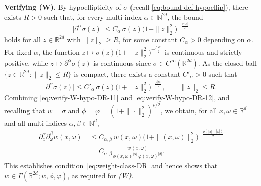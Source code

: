 \documentclass[a4paper,12pt]{article}
\let\originalleft\left
\let\originalright\right
\renewcommand{\left}{\mathopen{}\mathclose\bgroup\originalleft}
\renewcommand{\right}{\aftergroup\egroup\originalright}
\newcommand{\N}{\mathbb{N}}
\newcommand{\R}{\mathbb{R}}
\begin{document}

\textbf{Verifying (W).}
By hypoellipticity of $\sigma$ (recall \eqref{eq:bound-def-hypoellip}), there exists
$R>0$ such that, for every multi-index $\alpha\in\N^{2d}$, the bound
\begin{equation}\label{eq:verify-W-hypo-DR-11}
    \bigl|\partial^\alpha \sigma(z)\bigr|
    \le
    C_\alpha\,\sigma(z)
    \bigl(1+\|z\|_2^2\bigr)^{-\frac{\rho|\alpha|}{2}}
\end{equation}
holds for all $z\in\R^{2d}$ with $\|z\|_2\ge R$, for some constant $C_\alpha>0$
depending on $\alpha$.
For fixed $\alpha$, the function
$z\mapsto \sigma(z)\bigl(1+\|z\|_2^2\bigr)^{-\frac{\rho|\alpha|}{2}}$ is continuous
and strictly positive, while $z\mapsto \partial^\alpha\sigma(z)$ is continuous
since $\sigma\in C^\infty(\R^{2d})$.
As the closed ball $\{z\in\R^{2d}:\|z\|_2\le R\}$ is compact, there exists a
constant $C'_\alpha>0$ such that
\begin{equation}\label{eq:verify-W-hypo-DR-12}
    \bigl|\partial^\alpha \sigma(z)\bigr|
    \le
    C'_\alpha\,\sigma(z)
    \bigl(1+\|z\|_2^2\bigr)^{-\frac{\rho|\alpha|}{2}},
    \qquad
    \|z\|_2 \le R.
\end{equation}
Combining \eqref{eq:verify-W-hypo-DR-11} and \eqref{eq:verify-W-hypo-DR-12}, and
recalling that $w=\sigma$ and $\phi=\varphi=(1+\|\cdot\|_2^2)^{\rho/2}$, we obtain,
for all $x,\omega\in\R^d$ and all multi-indices $\alpha,\beta\in\N^d$,
\begin{align}
    \bigl|\partial_x^\alpha \partial_\omega^\beta w(x,\omega)\bigr|
    &\le
    C_{\alpha,\beta}\,w(x,\omega)
    \bigl(1+\|(x,\omega)\|_2^2\bigr)^{-\frac{\rho(|\alpha|+|\beta|)}{2}}
    \label{eq:verify-W-hypo-1}\\
    &=
    C_{\alpha,\beta}
        \frac{w(x,\omega)}
        {\phi(x,\omega)^{|\alpha|}\,\varphi(x,\omega)^{|\beta|}}
    .
    \label{eq:verify-W-hypo-2}
\end{align}
This establishes condition~\eqref{eq:weight-class-DR} and hence shows that
$w\in\Gamma(\R^{2d};w,\phi,\varphi)$, as required for \emph{(W)}.
\end{document}
